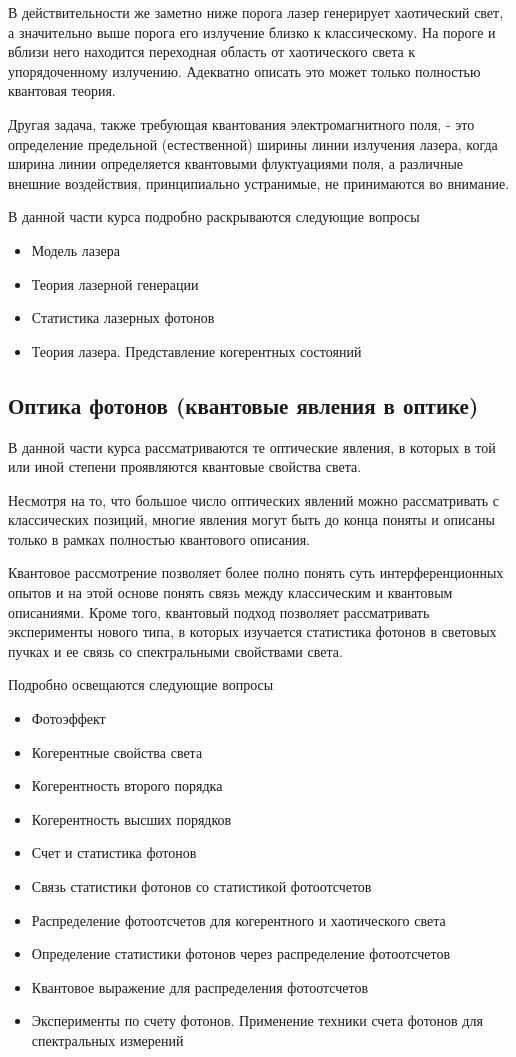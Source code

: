 В действительности же заметно ниже порога лазер генерирует хаотический
свет, а значительно выше порога его излучение близко к
классическому. На пороге и вблизи него находится переходная область от
хаотического света к упорядоченному излучению. Адекватно описать это
может только полностью квантовая теория. 

Другая задача, также требующая квантования электромагнитного поля, -
это определение предельной (естественной) ширины линии излучения
лазера, когда ширина линии определяется квантовыми флуктуациями поля,
а различные внешние воздействия, принципиально устранимые, не
принимаются во внимание. 

В данной части курса подробно раскрываются следующие вопросы
\begin{itemize}
\item Модель лазера
\item Теория лазерной генерации
\item Статистика лазерных фотонов
\item Теория лазера. Представление когерентных состояний
\end{itemize}

\subsection{Оптика фотонов (квантовые явления в оптике)}
В данной части курса рассматриваются те оптические явления, в которых
в той или иной степени проявляются квантовые свойства света. 

Несмотря на то, что большое число оптических явлений можно
рассматривать с классических позиций, многие явления могут быть до
конца поняты и описаны только в рамках полностью квантового описания. 

Квантовое рассмотрение позволяет более полно понять суть
интерференционных опытов и на этой основе понять связь между
классическим и квантовым описаниями. Кроме того, квантовый подход
позволяет рассматривать эксперименты нового типа, в которых изучается
статистика фотонов в световых пучках и ее связь со спектральными
свойствами света.

Подробно освещаются следующие вопросы
\begin{itemize}
\item Фотоэффект
\item Когерентные свойства света
\item Когерентность второго порядка
\item Когерентность высших порядков
\item Счет и статистика фотонов
\item Связь статистики фотонов со статистикой фотоотсчетов
\item Распределение фотоотсчетов для когерентного и хаотического
  света
\item Определение статистики фотонов через распределение
  фотоотсчетов
\item Квантовое выражение для распределения фотоотсчетов
\item Эксперименты по счету фотонов. Применение техники счета
  фотонов для спектральных измерений
\end{itemize} 

